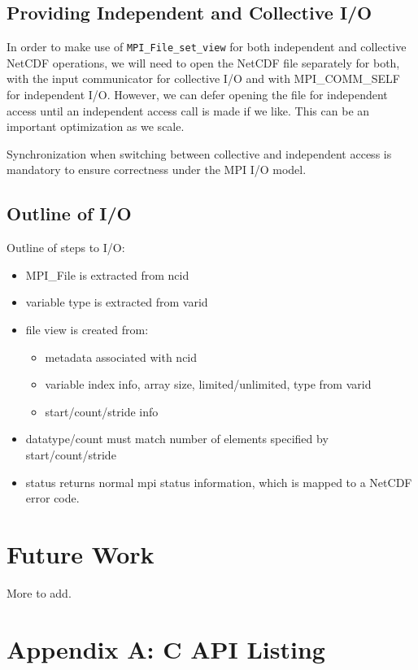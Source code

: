 \documentclass[10pt]{article}
\begin{document}
\subsection{Providing Independent and Collective I/O}
In order to make use of \texttt{MPI\_File\_set\_view} for both independent and
collective NetCDF operations, we will need to open the NetCDF file separately
for both, with the input communicator for collective I/O and with
MPI\_COMM\_SELF for independent I/O.  However, we can defer opening the file
for independent access until an independent access call is made if we like.
This can be an important optimization as we scale.

Synchronization when switching between collective and independent access is
mandatory to ensure correctness under the MPI I/O model.

\subsection{Outline of I/O}

Outline of steps to I/O:
\begin{itemize}
\item MPI\_File is extracted from ncid
\item variable type is extracted from varid
\item file view is created from:
  \begin{itemize}
  \item metadata associated with ncid
  \item variable index info, array size, limited/unlimited, type from varid
  \item start/count/stride info
  \end{itemize}
\item datatype/count must match number of elements specified by
  start/count/stride
\item status returns normal mpi status information, which is mapped to a
  NetCDF error code.
\end{itemize}


\section{Future Work}

More to add.

%
%



%
%
\section*{Appendix A: C API Listing}
\end{document}
